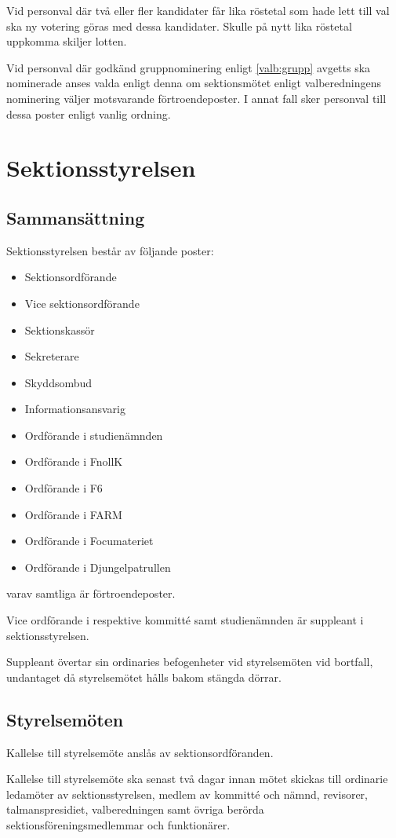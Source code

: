 \documentclass{styrdokument}
\begin{document}
\? Vid personval där två eller fler kandidater får lika röstetal som hade lett till val ska ny votering göras med dessa kandidater.
Skulle på nytt lika röstetal uppkomma skiljer lotten.

\? Vid personval där godkänd gruppnominering enligt \cref{valb:grupp} avgetts ska nominerade anses valda enligt denna om sektionsmötet enligt valberedningens nominering väljer motsvarande förtroendeposter.
I annat fall sker personval till dessa poster enligt vanlig ordning.

\section{Sektionsstyrelsen}
\subsection{Sammansättning}
\? Sektionsstyrelsen består av följande poster:
\begin{itemize}
    \item Sektionsordförande
	\item Vice sektionsordförande
	\item Sektionskassör
	\item Sekreterare
	\item Skyddsombud
	\item Informationsansvarig
	\item Ordförande i studienämnden
	\item Ordförande i FnollK
	\item Ordförande i F6
	\item Ordförande i FARM
	\item Ordförande i Focumateriet
	\item Ordförande i Djungelpatrullen
\end{itemize}
varav samtliga är förtroendeposter.
			
\? Vice ordförande i respektive kommitté samt studienämnden är suppleant i sektionsstyrelsen.
		
\? Suppleant övertar sin ordinaries befogenheter vid styrelsemöten vid bortfall, undantaget då styrelsemötet hålls bakom stängda dörrar.

\subsection{Styrelsemöten}
\? Kallelse till styrelsemöte anslås av sektionsordföranden.

\? Kallelse till styrelsemöte ska senast två dagar innan mötet skickas till ordinarie ledamöter av sektionsstyrelsen, medlem av kommitté och nämnd, revisorer, talmanspresidiet, valberedningen samt övriga berörda sektionsföreningsmedlemmar och funktionärer.
		
\end{document}
